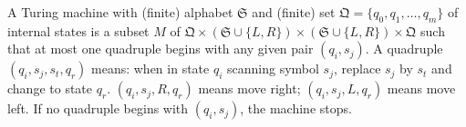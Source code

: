 A Turing machine with (finite) alphabet $\mathfrak{S}$ and (finite) set $\mathfrak{Q} = \{q_0, q_1, \ldots, q_m\}$ of internal states is a subset $M$ of $\mathfrak{Q} \times (\mathfrak{S} \cup \{L, R\}) \times (\mathfrak{S} \cup \{L, R\}) \times \mathfrak{Q}$ such that at most one quadruple begins with any given pair $(q_i, s_j)$. A quadruple $(q_i, s_j, s_t, q_r)$ means: when in state $q_i$ scanning symbol $s_j$, replace $s_j$ by $s_t$ and change to state $q_r$. $(q_i, s_j, R, q_r)$ means move right; $(q_i, s_j, L, q_r)$ means move left. If no quadruple begins with $(q_i, s_j)$, the machine stops.
